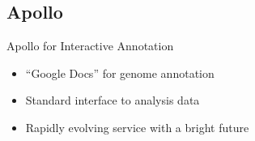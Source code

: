 \documentclass[12pt]{phage3slides} %
\begin{document}
{%
  \begin{frame}[plain]
  \end{frame}
}

{%
  \begin{frame}[plain]
  \end{frame}
}

\subsection{Apollo}
\begin{frame}{Apollo for Interactive Annotation}
	\begin{itemize}
		\item ``Google Docs'' for genome annotation
		\item Standard interface to analysis data
		\item Rapidly evolving service with a bright future
	\end{itemize}
\end{frame}
\end{document}
